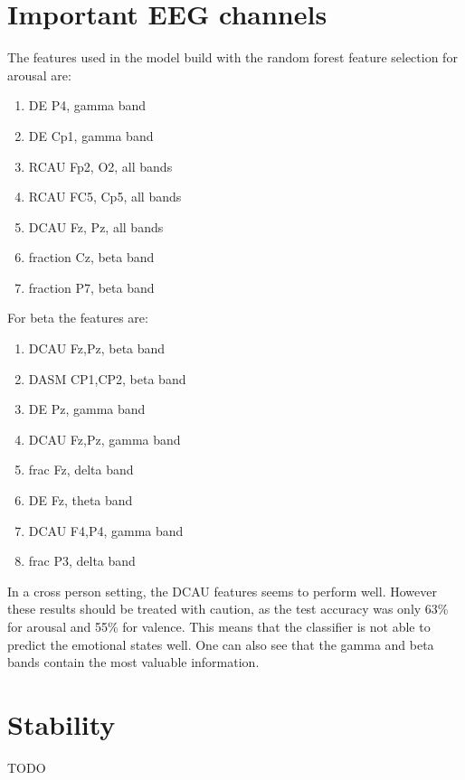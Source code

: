 \section{Important EEG channels}

The features used in the model build with the random forest feature selection for arousal are:
\begin{enumerate}
\item DE P4, gamma band
\item DE Cp1, gamma band
\item RCAU Fp2, O2, all bands
\item RCAU FC5, Cp5, all bands
\item DCAU Fz, Pz, all bands
\item fraction Cz, beta band
\item fraction P7, beta band
\end{enumerate}

For beta the features are:
\begin{enumerate}
\item DCAU Fz,Pz, beta band
\item DASM CP1,CP2, beta band
\item DE Pz, gamma band
\item DCAU Fz,Pz, gamma band
\item frac Fz, delta band
\item DE Fz, theta band
\item DCAU F4,P4, gamma band
\item frac P3, delta band
\end{enumerate}

In a cross person setting, the DCAU features seems to perform well. However these results should be treated with caution, as the test accuracy was only 63\% for arousal and 55\% for valence. This means that the classifier is not able to predict the emotional states well. One can also see that the gamma and beta bands contain the most valuable information.

\section{Stability}
TODO
